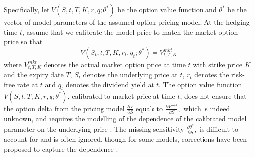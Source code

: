 \documentclass[letterpaper,12pt,titlepage,oneside,final]{book}
\numberwithin{equation}{section}
\theoremstyle{definition}
\newcommand{\Vmkt}{V^{mkt}}
\begin{document}
Specifically, let $V(S,t,T,K,r,q;\theta^*)$ be  the option value function and $\theta^*$ be the vector of model parameters of the assumed option pricing model. At the hedging time $t$, assume that we  calibrate the model price to match the market option price so that
\begin{equation} \label{eq:imp}
V(S_t,t,T,K,r_t,q_t; \theta^*)=V^{mkt}_{t,T,K}
\end{equation}
where $\Vmkt_{t,T,K}$ denotes the actual market option price at time $t$  with  strike price  $K$ and the expiry date  $T$, $S_t$ denotes the underlying price at $t$, $r_t$ denotes the risk-free rate at $t$ and $q_t$ denotes the dividend yield at $t$.
The option value function $V(S,t,T,K,r,q; \theta^*)$, calibrated to market price at time $t$,  does not ensure that the option delta from the pricing model $\frac{\partial V}{\partial S}$
equals to
$
\frac{\partial \Vmkt}{\partial S},
$
which is indeed unknown, and requires the modelling  of the dependence of the calibrated model parameter on the underlying price \citep{knian2017,coleman2001,hulloptimal}. The missing sensitivity $
\frac{\partial \theta^*}{\partial S},
$ is difficult to account for and is often ignored, though
for some models, corrections have been proposed to capture the dependence \citep{hulloptimal,hagan2017bartlett,bartlett2006hedging}.
\end{document}
